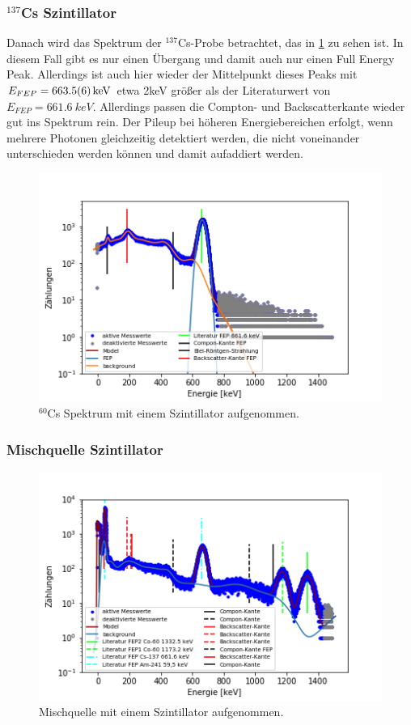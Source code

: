 \subsubsection{$^{137}$Cs Szintillator}
Danach wird das Spektrum der $^{137}$Cs-Probe betrachtet, das in \cref{cs_sz} zu sehen ist. In diesem Fall gibt es nur einen Übergang und damit auch nur einen Full Energy Peak. Allerdings ist auch hier wieder der Mittelpunkt dieses Peaks mit $E_{FEP} = \SI{663,5 \pm 0,6}{keV}$ etwa 2keV größer als der Literaturwert von $E_{FEP} = \SI{661,6}{keV}$. Allerdings passen die Compton- und Backscatterkante wieder gut ins Spektrum rein. Der Pileup bei höheren Energiebereichen erfolgt, wenn mehrere Photonen gleichzeitig detektiert werden, die nicht voneinander unterschieden werden können und damit aufaddiert werden.



\begin{figure}[ht]
	\centering
	\includegraphics[scale=0.8]{cs_sz_.png}
	\caption{$^{60}$Cs Spektrum mit einem Szintillator aufgenommen.}
	\label{cs_sz}
\end{figure}



\subsubsection{Mischquelle Szintillator}

\begin{figure}[ht]
	\centering
	\includegraphics[scale=0.8]{../Messwerte/Mischquelle_sz_.png}
	\caption{Mischquelle mit einem Szintillator aufgenommen.}
	\label{Mischquelle_sz}
\end{figure}


